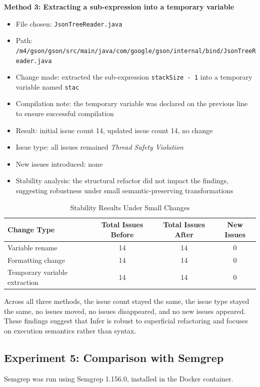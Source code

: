 \documentclass[11pt]{article}
\begin{document}
\textbf{Method 3: Extracting a sub-expression into a temporary variable}
\begin{itemize}
\item File chosen: \texttt{JsonTreeReader.java}
\item Path: \texttt{/m4/gson/gson/src/main/java/com/google/gson/internal/bind/JsonTreeReader.java}
\item Change made: extracted the sub-expression \texttt{stackSize - 1} into a temporary variable named \texttt{stac}
\item Compilation note: the temporary variable was declared on the previous line to ensure successful compilation
\item Result: initial issue count 14, updated issue count 14, no change
\item Issue type: all issues remained \textit{Thread Safety Violation}
\item New issues introduced: none
\item Stability analysis: the structural refactor did not impact the findings, suggesting robustness under small semantic-preserving transformations
\end{itemize}

\begin{table}[H]
\centering
\caption{Stability Results Under Small Changes}
\begin{tabular}{lccc}
\toprule
Change Type & Total Issues Before & Total Issues After & New Issues \\
\midrule
Variable rename & 14 & 14 & 0 \\
Formatting change & 14 & 14 & 0 \\
Temporary variable extraction & 14 & 14 & 0 \\
\bottomrule
\end{tabular}
\end{table}

Across all three methods, the issue count stayed the same, the issue type stayed the same, no issues moved, no issues disappeared, and no new issues appeared. These findings suggest that Infer is robust to superficial refactoring and focuses on execution semantics rather than syntax.

\subsection{Experiment 5: Comparison with Semgrep}
Semgrep was run using Semgrep 1.156.0, installed in the Docker container.
\end{document}
